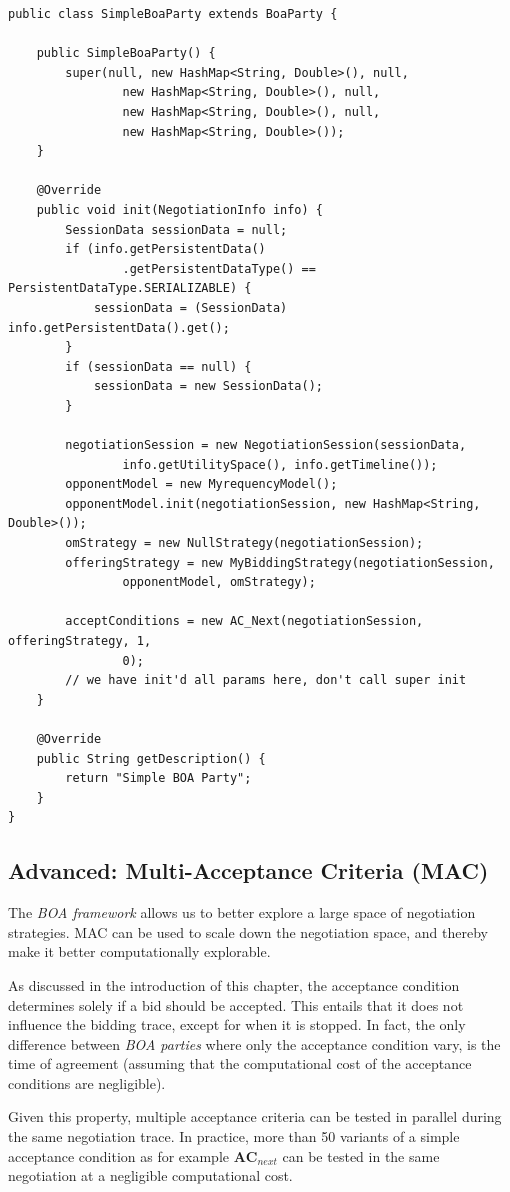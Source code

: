 \documentclass[]{article}
\begin{document}
\begin{lstlisting}
public class SimpleBoaParty extends BoaParty {

	public SimpleBoaParty() {
		super(null, new HashMap<String, Double>(), null,
				new HashMap<String, Double>(), null,
				new HashMap<String, Double>(), null,
				new HashMap<String, Double>());
	}

	@Override
	public void init(NegotiationInfo info) {
		SessionData sessionData = null;
		if (info.getPersistentData()
				.getPersistentDataType() == PersistentDataType.SERIALIZABLE) {
			sessionData = (SessionData) info.getPersistentData().get();
		}
		if (sessionData == null) {
			sessionData = new SessionData();
		}

		negotiationSession = new NegotiationSession(sessionData,
				info.getUtilitySpace(), info.getTimeline());
		opponentModel = new MyrequencyModel();
		opponentModel.init(negotiationSession, new HashMap<String, Double>());
		omStrategy = new NullStrategy(negotiationSession);
		offeringStrategy = new MyBiddingStrategy(negotiationSession,
				opponentModel, omStrategy);

		acceptConditions = new AC_Next(negotiationSession, offeringStrategy, 1,
				0);
		// we have init'd all params here, don't call super init
	}

	@Override
	public String getDescription() {
		return "Simple BOA Party";
	}
}
\end{lstlisting}

\subsection{Advanced: Multi-Acceptance Criteria (MAC)}
The \textit{BOA framework} allows us to better explore a large space of negotiation strategies. MAC can be used to scale down the negotiation space, and thereby make it better computationally explorable.

As discussed in the introduction of this chapter, the acceptance condition determines solely if a bid should be accepted. This entails that it does not influence the bidding trace, except for when it is stopped. In fact, the only difference between \textit{BOA parties} where only the acceptance condition vary, is the time of agreement (assuming that the computational cost of the acceptance conditions are negligible).

Given this property, multiple acceptance criteria can be tested in parallel during the same negotiation trace. In practice, more than 50 variants of a simple acceptance condition as for example $\textbf{AC}_{next}$ can be tested in the same negotiation at a negligible computational cost.
\end{document}
